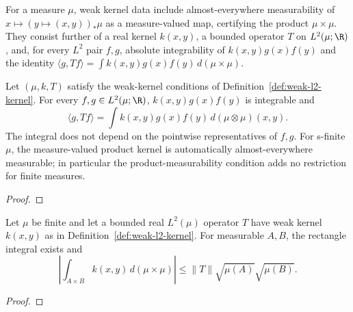 \begin{supporting}
\begin{definition}
\label{def:weak-l2-kernel}
\leanok
For a measure $\mu$, weak kernel data include almost-everywhere measurability
of $x\mapsto (y\mapsto(x,y))_*\mu$ as a measure-valued map, certifying the
product $\mu\times\mu$. They consist further of a real kernel $k(x,y)$,
a bounded operator $T$ on $L^2(\mu;\R)$, and, for every $L^2$ pair $f,g$,
absolute integrability of $k(x,y)g(x)f(y)$ and the identity
$\langle g,Tf\rangle=\int k(x,y)g(x)f(y)\,d(\mu\times\mu)$.
\end{definition}
\begin{theorem}
\label{thm:weak-l2-kernel}
\leanok
Let $(\mu,k,T)$ satisfy the weak-kernel conditions of
Definition~\ref{def:weak-l2-kernel}. For every $f,g\in L^2(\mu;\R)$,
$k(x,y)g(x)f(y)$ is integrable and
\[
 \langle g,Tf\rangle=\int k(x,y)g(x)f(y)\,d(\mu\otimes\mu)(x,y).
\]
The integral does not depend on the pointwise representatives of $f,g$.
For s-finite $\mu$, the measure-valued product kernel is automatically
almost-everywhere measurable; in particular the product-measurability
condition adds no restriction for finite measures.
\end{theorem}
\begin{proof}
\leanok
\end{proof}

\begin{theorem}
\label{thm:kernel-rectangle-test}
\leanok
Let $\mu$ be finite and let a bounded real $L^2(\mu)$ operator $T$ have
weak kernel $k(x,y)$ as in Definition~\ref{def:weak-l2-kernel}.
For measurable $A,B$, the rectangle integral exists and
\[
 \left|\int_{A\times B}k(x,y)\,d(\mu\times\mu)\right|
 \le \|T\|\sqrt{\mu(A)}\sqrt{\mu(B)}.
\]
\end{theorem}
\begin{proof}
\leanok
\end{proof}



\end{supporting}
